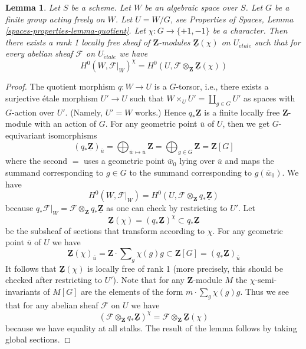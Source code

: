 \documentclass{stacks-project}
\theoremstyle{plain}
\newtheorem{lemma}[subsection]{Lemma}
\theoremstyle{definition}
\theoremstyle{remark}
\numberwithin{equation}{subsection}
\def\etale{{\acute{e}tale}}
\begin{document}
\begin{lemma}
\label{lemma-twist}
Let $S$ be a scheme. Let $W$ be an algebraic space over $S$.
Let $G$ be a finite group acting freely on $W$.
Let $U = W/G$, see
Properties of Spaces, Lemma \ref{spaces-properties-lemma-quotient}.
Let $\chi : G \to \{+1, -1\}$ be a character.
Then there exists a rank 1 locally free sheaf of $\mathbf{Z}$-modules
$\underline{\mathbf{Z}}(\chi)$ on $U_\etale$ such that for every
abelian sheaf $\mathcal{F}$ on $U_\etale$ we have
$$
H^0(W, \mathcal{F}|_W)^\chi =
H^0(U, \mathcal{F} \otimes_{\mathbf{Z}} \underline{\mathbf{Z}}(\chi))
$$
\end{lemma}

\begin{proof}
The quotient morphism $q : W \to U$ is a $G$-torsor, i.e., there exists
a surjective \'etale morphism $U' \to U$ such that
$W \times_U U' = \coprod_{g \in G} U'$ as spaces with $G$-action over $U'$.
(Namely, $U' = W$ works.) Hence $q_*\underline{\mathbf{Z}}$ is a finite
locally free $\mathbf{Z}$-module with an action of $G$. For any
geometric point $\overline{u}$ of $U$, then we get $G$-equivariant
isomorphisms
$$
(q_*\underline{\mathbf{Z}})_{\overline{u}}
= \bigoplus\nolimits_{\overline{w} \mapsto \overline{u}} \mathbf{Z}
= \bigoplus\nolimits_{g \in G} \mathbf{Z} = \mathbf{Z}[G]
$$
where the second $=$ uses a geometric point
$\overline{w}_0$ lying over $\overline{u}$ and
maps the summand corresponding to $g \in G$ to the summand
corresponding to $g(\overline{w}_0)$. We have
$$
H^0(W, \mathcal{F}|_W) =
H^0(U, \mathcal{F} \otimes_\mathbf{Z} q_*\underline{\mathbf{Z}})
$$
because
$q_*\mathcal{F}|_W = \mathcal{F} \otimes_\mathbf{Z} q_*\underline{\mathbf{Z}}$
as one can check by restricting to $U'$. Let
$$
\underline{\mathbf{Z}}(\chi) =
(q_*\underline{\mathbf{Z}})^\chi \subset
q_*\underline{\mathbf{Z}}
$$
be the subsheaf of sections that transform according to $\chi$. For
any geometric point $\overline{u}$ of $U$ we have
$$
\underline{\mathbf{Z}}(\chi)_{\overline{u}} =
\mathbf{Z} \cdot \sum\nolimits_g \chi(g) g
\subset
\mathbf{Z}[G] = (q_*\underline{\mathbf{Z}})_{\overline{u}}
$$
It follows that $\underline{\mathbf{Z}}(\chi)$ is locally free of
rank 1 (more precisely, this should be checked after restricting to $U'$).
Note that for any $\mathbf{Z}$-module $M$ the $\chi$-semi-invariants
of $M[G]$ are the elements of the form $m \cdot \sum\nolimits_g \chi(g) g$.
Thus we see that for any abelian sheaf $\mathcal{F}$ on $U$ we have
$$
\left(\mathcal{F} \otimes_\mathbf{Z} q_*\underline{\mathbf{Z}}\right)^\chi
=
\mathcal{F} \otimes_\mathbf{Z} \underline{\mathbf{Z}}(\chi)
$$
because we have equality at all stalks. The result of the lemma follows by
taking global sections.
\end{proof}
\end{document}

